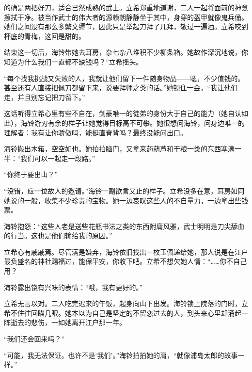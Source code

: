 \documentclass{article}
\begin{document}
的确是两把好刀，适合已然成熟的武士。立希郑重地道谢，二人一起将面前的神龛擦拭干净。被当作武士的伟大者的源赖朝静静坐于其中，身穿的盔甲就像鬼兵俑。她们之间没有那么多繁文缛节，因此只是举起刀拜了几拜，敬过一遍酒。立希咬到杯底的青梅，这回是甜的。



结束这一切后，海铃带她去耳房，杂七杂八堆积不少柳条箱。她故作深沉地说，你知道为什么我们一直都不缺钱吗？”立希摇头。



“每个找我挑战又失败的人，我就让他们留下一件随身物品——嗯，不少值钱的。甚至还有人直接把佩刀都留下来，说要拜师之类的话。”她顿住一会，“我让他们走，并且别忘记把刀留下。”



这话听得立希心里有些不自在，剑豪唯一的徒弟的身份大于自己的能力（她自认如此），海铃游刃有余的样子让她觉得目标高不可攀。她很想问海铃，问身边唯一的理解者：我有让你骄傲吗，能挺直脊背吗？最终没能问出口。



海铃搬出木箱，空空如也。她拍拍脑门，又拿来药葫芦和干粮一类的东西塞满一半：“我们可以一起走一段路。”



“你终于要出山？”



“没错，应一位故人的邀请。”海铃一副欲言又止的样子。立希没多在意，耳房如同她说的一般，收集不少珍贵的宝物。她一边哀叹这些人的不自量力，一边拿出些钱票。



海铃抱怨：“这些人老是送些花瓶书法之类的东西附庸风雅，武士明明是刀尖舔血的行当。这也是他们输给我的原因。”



立希心有戚戚焉。尽管满是嫌弃，海铃依旧找出一枚玉佩递给她，那人说是在江户最负盛名的神社赐福过，能保平安，你收下吧。立希不想欠她人情：“……你不自己用？



海铃露出饶有兴味的表情：“哦，我有更好的。”



立希无言以对。二人吃完迟来的午饭，起身向山下出发。海铃锁上院落的门时，立希不住往回瞄几眼。她本以为自己是坚定的不留恋过去的人，到头来心里却涌起一阵逝去的悲伤，一如她离开江户那一年。



“我们还会回来吗？”



“可能，我无法保证。也许不是‘我们’。”海铃拍拍她的肩，“就像浦岛太郎的故事一样。”
\end{document}
